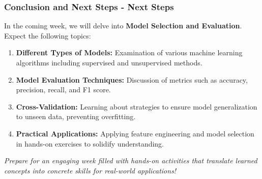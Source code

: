 \documentclass[aspectratio=169]{beamer}
\begin{document}
\begin{frame}[fragile]
  \frametitle{Conclusion and Next Steps - Next Steps}
  
  In the coming week, we will delve into \textbf{Model Selection and Evaluation}. Expect the following topics:
  \begin{enumerate}
    \item \textbf{Different Types of Models:} Examination of various machine learning algorithms including supervised and unsupervised methods.
    \item \textbf{Model Evaluation Techniques:} Discussion of metrics such as accuracy, precision, recall, and F1 score.
    \item \textbf{Cross-Validation:} Learning about strategies to ensure model generalization to unseen data, preventing overfitting.
    \item \textbf{Practical Applications:} Applying feature engineering and model selection in hands-on exercises to solidify understanding.
  \end{enumerate}
  
  \vspace{0.5cm}
  \textit{Prepare for an engaging week filled with hands-on activities that translate learned concepts into concrete skills for real-world applications!}
\end{frame}
\end{document}
